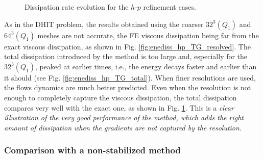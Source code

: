 \begin{figure}[h!]
	\centering	
	\caption{Dissipation rate evolution for the $h$-$p$ refinement cases.}
	\label{fig:enediss_hp_TG}
\end{figure}

As in the DHIT problem, the results obtained using the coarser $32^3 (Q_1)$ and $64^3 (Q_1)$ meshes are not accurate, the FE viscous dissipation being far from the exact viscous dissipation, as shown in Fig. \ref{fig:enediss_hp_TG_resolved}. The total dissipation introduced by the method is too large and, especially for the $32^3 (Q_1)$, peaked at earlier times, i.e., the energy decays faster and earlier than it should (see Fig. \ref{fig:enediss_hp_TG_total}). When finer resolutions are used, the flows dynamics are much better predicted. Even when the resolution is not enough to completely capture the viscous dissipation, the total dissipation compares very well with the exact one, as shown in  Fig. \ref{fig:enediss_hp_TG}. This is a \emph{clear illustration of the very good performance of the method, which adds the right amount of dissipation when the gradients are not captured by the resolution.}

\subsubsection{Comparison with a non-stabilized method}

